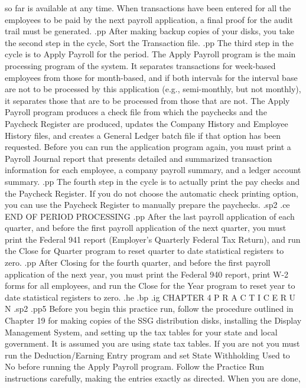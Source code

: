 so far is available at any time.  When transactions have been entered for
all the employees to be paid by the next payroll application, a final proof
for the audit trail must be generated.
.pp
After making backup copies of your disks, you take the second step in
the cycle, Sort the Transaction file.
.pp
The third step in the cycle is to Apply Payroll for the period.  The
Apply Payroll program is the main processing program of the system.
It separates
transactions for week-based employees from those for month-based,
and if both intervals for the interval base are not to be processed
by this application (e.g., semi-monthly, but not monthly), it separates
those that are to be processed from those that are not.  The Apply Payroll
program produces a check file from which the paychecks and
the Paycheck Register are produced, updates the Company History and
Employee History files, and creates a General Ledger batch file if
that option has been requested.  Before you can run the application program
again, you must
print a Payroll Journal report that presents detailed and summarized
transaction information for each employee, a company payroll summary,
and a ledger account summary.
.pp
The fourth step in the cycle is to actually print the pay checks and
the Paycheck Register.	If you do not choose the automatic check
printing option, you can use the Paycheck Register to manually prepare
the paychecks.
.sp2
.ce
END OF PERIOD PROCESSING
.pp
After the last payroll application of each quarter,
and before the first payroll application
of the next quarter, you must print the Federal 941 report
(Employer's Quarterly
Federal Tax Return), and run the
Close for Quarter program to reset quarter to date statistical
registers to zero.
.pp
After Closing for the fourth quarter, and before the first payroll application
of the next year, you must print the Federal 940 report,
print W-2 forms for all employees,
and run the Close for the Year program to reset
year to date statistical registers to zero.
.he
.bp
.ig
CHAPTER 4
P R A C T I C E    R U N
.sp2
.pp5
Before you begin this practice run, follow the procedure outlined in
Chapter 19 for making copies of the SSG distribution disks, installing
the Display Management System, and setting up the tax tables for your state
and local government. It is assumed you are using state tax tables.  If you
are not you must run the Deduction/Earning Entry program and set
State Withholding Used to No before running
the Apply Payroll program.
Follow the Practice Run
instructions carefully, making the
entries exactly as directed.  When you are done,
